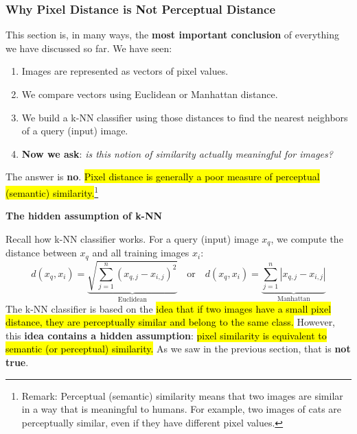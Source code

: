 \subsubsection{Why Pixel Distance is Not Perceptual Distance}\label{sec:why-pixel-distance-is-not-perceptual-distance}

This section is, in many ways, the \textbf{most important conclusion} of everything we have discussed so far. We have seen:
\begin{enumerate}
    \item Images are represented as vectors of pixel values.
    \item We compare vectors using Euclidean or Manhattan distance.
    \item We build a k-NN classifier using those distances to find the nearest neighbors of a query (input) image.
    \item \textbf{Now we ask}: \emph{is this notion of similarity actually meaningful for images?}
\end{enumerate}
The answer is \textbf{no}. \hl{Pixel distance is generally a poor measure of perceptual (semantic) similarity.}\footnote{%
    Remark: Perceptual (semantic) similarity means that two images are similar in a way that is meaningful to humans. For example, two images of cats are perceptually similar, even if they have different pixel values.
}

\highspace
\begin{flushleft}
    \textcolor{Red2}{ \textbf{The hidden assumption of k-NN}}
\end{flushleft}
Recall how k-NN classifier works. For a query (input) image $x_q$, we compute the distance between $x_q$ and all training images $x_i$:
\begin{equation*}
    d(x_q, x_i) = \underbrace{\sqrt{\sum_{j=1}^{n} \left(x_{q,j} - x_{i,j}\right)^2}}_{\text{Euclidean}} \quad \text{or} \quad d(x_q, x_i) = \underbrace{\sum_{j=1}^{n} \left|x_{q,j} - x_{i,j}\right|}_{\text{Manhattan}}
\end{equation*}
The k-NN classifier is based on the \hl{idea that if two images have a small pixel distance, they are perceptually similar and belong to the same class.} However, this \textbf{idea contains a hidden assumption}: \hl{pixel similarity is equivalent to semantic (or perceptual) similarity.} As we saw in the previous section, that is \textbf{not true}.


